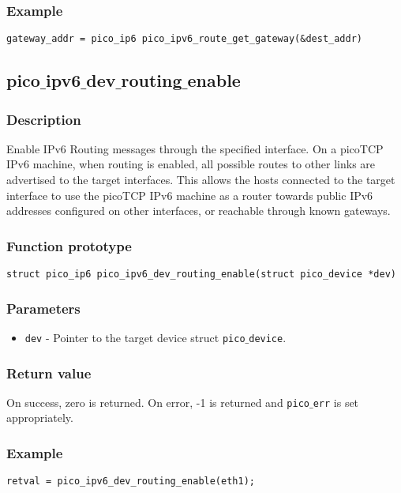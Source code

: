 \subsubsection*{Example}
\begin{verbatim}
gateway_addr = pico_ip6 pico_ipv6_route_get_gateway(&dest_addr)
\end{verbatim}

\subsection{pico$\_$ipv6$\_$dev$\_$routing$\_$enable}

\subsubsection*{Description}
Enable IPv6 Routing messages through the specified interface. On a picoTCP IPv6 machine, 
when routing is enabled, all possible routes to other links are advertised to the target interfaces.
This allows the hosts connected to the target interface to use the picoTCP IPv6 machine as a router
towards public IPv6 addresses configured on other interfaces, or reachable through known gateways.

\subsubsection*{Function prototype}
\begin{verbatim}
struct pico_ip6 pico_ipv6_dev_routing_enable(struct pico_device *dev)
\end{verbatim}

\subsubsection*{Parameters}
\begin{itemize}[noitemsep]
\item \texttt{dev} - Pointer to the target device struct \texttt{pico$\_$device}.
\end{itemize}

\subsubsection*{Return value}
On success, zero is returned.
On error, -1 is returned and \texttt{pico$\_$err} is set appropriately.

\subsubsection*{Example}
\begin{verbatim}
retval = pico_ipv6_dev_routing_enable(eth1);
\end{verbatim}

